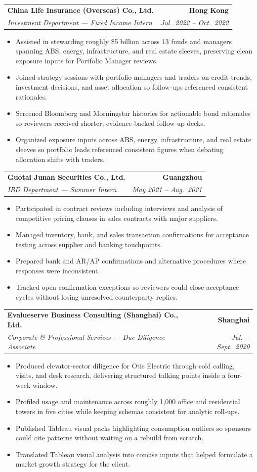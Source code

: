 \documentclass[9pt,a4paper]{extarticle}
\makeatletter
\newcommand{\resumeSubheading}[4]{%
  \vspace{0.6em}%
  \begin{tabular*}{\textwidth}{l@{\extracolsep{\fill}}r}
    \textbf{#1} & \textbf{#2} \\
    \textit{\small #3} & \textit{\small #4} \\
  \end{tabular*}\vspace{0.32em}}
\makeatother
\begin{document}
\resumeSubheading{China Life Insurance (Overseas) Co., Ltd.}{Hong Kong}{Investment Department --- Fixed Income Intern}{Jul.\ 2022 -- Oct.\ 2022}
\begin{itemize}
  \item Assisted in stewarding roughly \$5 billion across 13 funds and managers spanning ABS, energy, infrastructure, and real estate sleeves, preserving clean exposure inputs for Portfolio Manager reviews.
  \item Joined strategy sessions with portfolio managers and traders on credit trends, investment decisions, and asset allocation so follow-ups referenced consistent rationales.
  \item Screened Bloomberg and Morningstar histories for actionable bond rationales so reviewers received shorter, evidence-backed follow-up decks.
  \item Organized exposure inputs across ABS, energy, infrastructure, and real estate sleeves so portfolio leads referenced consistent figures when debating allocation shifts with traders.
\end{itemize}

\resumeSubheading{Guotai Junan Securities Co., Ltd.}{Guangzhou}{IBD Department --- Summer Intern}{May 2021 -- Aug.\ 2021}
\begin{itemize}
  \item Participated in contract reviews including interviews and analysis of competitive pricing clauses in sales contracts with major suppliers.
  \item Managed inventory, bank, and sales transaction confirmations for acceptance testing across supplier and banking touchpoints.
  \item Prepared bank and AR/AP confirmations and alternative procedures where responses were inconsistent.
  \item Tracked open confirmation exceptions so reviewers could close acceptance cycles without losing unresolved counterparty replies.
\end{itemize}

\resumeSubheading{Evalueserve Business Consulting (Shanghai) Co., Ltd.}{Shanghai}{Corporate \& Professional Services --- Due Diligence Associate}{Jul.\ -- Sept.\ 2020}
\begin{itemize}
  \item Produced elevator-sector diligence for Otis Electric through cold calling, visits, and desk research, delivering structured talking points inside a four-week window.
  \item Profiled usage and maintenance across roughly 1{,}000 office and residential towers in five cities while keeping schemas consistent for analytic roll-ups.
  \item Published Tableau visual packs highlighting consumption outliers so sponsors could cite patterns without waiting on a rebuild from scratch.
  \item Translated Tableau visual analysis into concise inputs that helped formulate a market growth strategy for the client.
\end{itemize}
\end{document}
